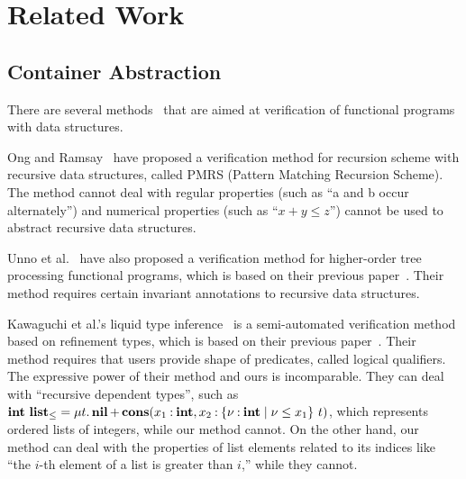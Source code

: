 \section{Related Work}
\label{sec:related}

\subsection{Container Abstraction}
There are several
methods~\cite{Ong2011,Kobayashi2010,Unno2010,Rondon2008,Kawaguchi2009,Chin2003}
that are aimed at verification of functional programs with data
structures.

Ong and Ramsay~\cite{Ong2011} have proposed a verification method
for recursion scheme with recursive data structures, called PMRS (Pattern
Matching Recursion Scheme).  The method
cannot deal with regular properties (such as ``a and b occur
alternately'') and numerical properties (such as ``$x+y \leq z$'') cannot be used
to abstract recursive data structures.

Unno et al.~\cite{Unno2010} have also proposed a verification method for
higher-order tree processing functional programs, which is based on
their previous paper~\cite{Kobayashi2010}. Their method requires certain
invariant annotations to recursive data structures.

Kawaguchi et al.'s liquid type inference~\cite{Kawaguchi2009} is a
semi-automated verification method based on refinement types, which is
based on their previous paper~\cite{Rondon2008}.  Their method requires
that users provide shape of predicates, called logical qualifiers.  The
expressive power of their method and ours is incomparable.  They can
deal with ``recursive dependent types'', such as ${\mathbf{int}}~{\mathbf{list}_\leq}
= \mu{t}.\, { \mathbf{nil} \mathop{+}
\mathbf{cons}({x_1\mathbin{:}\mathbf{int}},{x_2\mathbin{:}{\{\nu\mathbin{:}\mathbf{int} \mid \nu \leq x_1\}}~{t}})}$,
which represents ordered lists of integers, while our method cannot. On
the other hand, our method can deal with the properties of list elements
related to its indices like ``the $i$-th element of a list is greater
than $i$,'' while they cannot.

